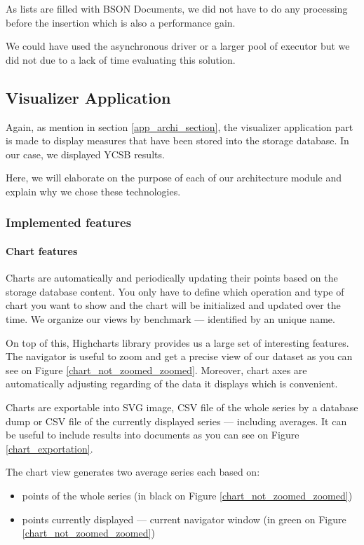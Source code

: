 \documentclass[a4paper,11pt]{report}
\begin{document}
As lists are filled with BSON Documents, we did not have to do any processing before the insertion which is also a performance gain. 

\bigskip

We could have used the asynchronous driver or a larger pool of executor but we did not due to a lack of time evaluating this solution.

\subsection{Visualizer Application}

Again, as mention in section \ref{app_archi_section}, the visualizer application part is made to display measures that have been stored into the storage database. In our case, we displayed YCSB results. 

Here, we will elaborate on the purpose of each of our architecture module and explain why we chose these technologies.

\subsubsection{Implemented features}

\paragraph{Chart features}

Charts are automatically and periodically updating their points based on the storage database content. You only have to define which operation and type of chart you want to show and the chart will be initialized and updated over the time. We organize our views by benchmark --- identified by an unique name.

On top of this, Highcharts library \cite{highcharts:website} provides us a large set of interesting features. 
The navigator is useful to zoom and get a precise view of our dataset as you can see on Figure \ref{chart_not_zoomed_zoomed}. 
Moreover, chart axes are automatically adjusting regarding of the data it displays which is convenient. 

Charts are exportable into SVG image, CSV file of the whole series by a database dump or CSV file of the currently displayed series --- including averages. It can be useful to include results into documents as you can see on Figure \ref{chart_exportation}.

The chart view generates two average series each based on:
\begin{itemize}
\item
points of the whole series (in black on Figure \ref{chart_not_zoomed_zoomed})
\item
points currently displayed --- current navigator window (in green on Figure \ref{chart_not_zoomed_zoomed})
\end{itemize}
\end{document}
